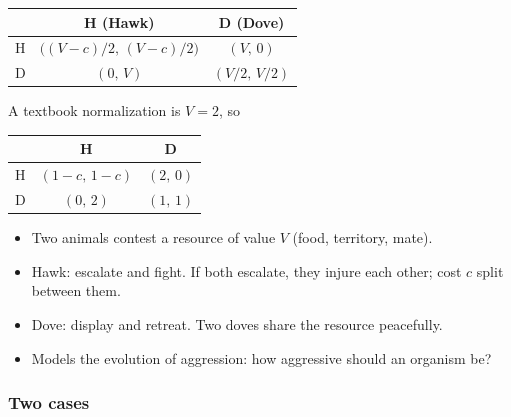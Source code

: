 \documentclass[20pt]{extarticle}
\begin{document}
\begin{center}
\begin{tabular}{|c||c|c|}
\hline
 & H (Hawk) & D (Dove) \\
\hline\hline
H & $\bigl((V-c)/2,\,(V-c)/2\bigr)$ & $(V,\,0)$ \\
\hline
D & $(0,\,V)$ & $(V/2,\,V/2)$ \\
\hline
\end{tabular}
\end{center}

A textbook normalization is $V=2$, so

\begin{center}
\begin{tabular}{|c||c|c|}
\hline
 & H & D \\
\hline\hline
H & $(1-c,\,1-c)$ & $(2,\,0)$ \\
\hline
D & $(0,\,2)$ & $(1,\,1)$ \\
\hline
\end{tabular}
\end{center}

\begin{itemize}
\item Two animals contest a resource of value $V$ (food, territory, mate).
\item Hawk: escalate and fight. If both escalate, they injure each other; cost $c$ split between them.
\item Dove: display and retreat. Two doves share the resource peacefully.
\item Models the evolution of aggression: how aggressive should an organism be?
\end{itemize}

\subsubsection*{Two cases}
\end{document}
